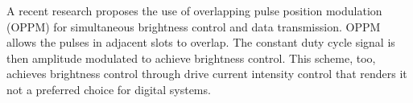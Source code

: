 A recent research \cite{bai2010joint} proposes the use of overlapping pulse position modulation (OPPM) for simultaneous brightness control and data transmission.  OPPM allows the pulses in adjacent slots to overlap. The constant duty cycle signal is then amplitude modulated to achieve brightness control. This scheme, too, achieves brightness control through drive current intensity control that renders it not a preferred choice for digital systems.


